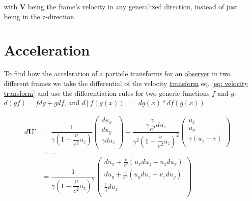 with $\mathbf{V}$ being the frame's velocity in any generalized direction, instead of just being in the z-direction

\section{Acceleration}

To find how the acceleration of a particle transforms for an \hyperlink{def-observer}{observer} in two different frames we take the differential of the velocity \hyperlink{def-transform}{transform} eq.
\eqref{eq: velocity transform} and use the differentiation rules for two generic functions $f$ and $g$: $d(gf)=f dg+g df$, and $d[f(g(x))]= dg(x) * df(g(x))$

\begin{equation}
	\begin{aligned}
		d\mathbf{U}{'} & = \dfrac{1}{{\gamma}\left(1- \dfrac{v}{c^2} {{u}_{z}}\right) }
		\begin{pmatrix}
			d{{u}_{x}}          \\
			d{{u}_{y}}          \\
			{\gamma} d{{u}_{z}} \\
		\end{pmatrix}
		+ \dfrac{{\gamma} \dfrac{v}{c^2} d{{u}_{z}}}{{\gamma}^2\left(1- \dfrac{v}{c^2} {{u}_{z}}\right)^2 }
		\begin{pmatrix}
			{{u}_{x}}                             \\
			{{u}_{y}}                             \\
			{\gamma} \left( {{u}_{z}} - v \right) \\
		\end{pmatrix}                                           \\
		             & = ...
                                                     \\
		             & = \dfrac{1}{{\gamma}\left(1- \dfrac{v}{c^2} {{u}_{z}}\right)^2 }
		\begin{pmatrix}
			d{{u}_{x}} + \frac{v}{c^2}( {{u}_{x}} d{{u}_{z}} - {{u}_{z}} d{{u}_{x}}) \\
			d{{u}_{y}} + \frac{v}{c^2}( {{u}_{y}} d{{u}_{z}} - {{u}_{z}} d{{u}_{y}}) \\
			\frac{1}{{\gamma}} d{{u}_{z}}                    \\
		\end{pmatrix}
	\end{aligned}
\end{equation}

